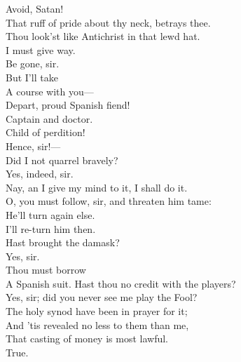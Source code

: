 \documentclass[a4paper,oneside,12pt]{memoir}
\begin{document}
\begin{drama*}
\persecutionspeaks {} Avoid, Satan!\\
That ruff of pride about thy neck, betrays thee.\\
Thou look'st like Antichrist in that lewd hat.\\
\surlyspeaks I must give way.\\
\kastrilspeaks {} Be gone, sir.\\
\surlyspeaks {} But I'll take\\
A course with you---\\
\persecutionspeaks {} Depart, proud Spanish fiend!\\
\surlyspeaks Captain and doctor.\\
\persecutionspeaks {} Child of perdition!\\
\kastrilspeaks Hence, sir!---\\
 Did I not quarrel bravely?\\
\facespeaks {} Yes, indeed, sir.\\
\kastrilspeaks Nay, an I give my mind to it, I shall do it.\\
\facespeaks O, you must follow, sir, and threaten him tame:\\
He'll turn again else.\\
\kastrilspeaks {} I'll re-turn him then.\\
\facespeaks Hast brought the damask?\\
\druggerspeaks {} Yes, sir.\\
\facespeaks {} Thou must borrow\\
A Spanish suit. Hast thou no credit with the players?\\
\druggerspeaks Yes, sir; did you never see me play the Fool?\\
\persecutionspeaks The holy synod have been in prayer for it;\\
And 'tis revealed no less to them than me,\\
That casting of money is most lawful.\\
\subtlespeaks {} True.\\

\end{drama*}
\end{document}
